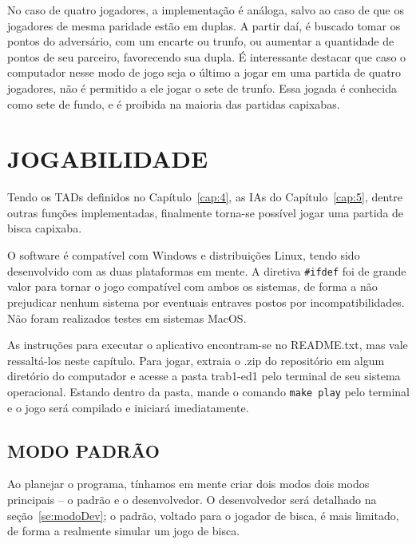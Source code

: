 \documentclass[12pt, oneside, a4paper, brazil]{abntex2}
\begin{document}
No caso de quatro jogadores, a implementação é análoga, salvo ao caso de que os jogadores de mesma paridade estão em duplas. A partir daí, é buscado tomar os pontos do adversário, com um encarte ou trunfo, ou aumentar a quantidade de pontos de seu parceiro, favorecendo sua dupla. É interessante destacar que caso o computador nesse modo de jogo seja o último a jogar em uma partida de quatro jogadores, não é permitido a ele jogar o sete de trunfo. Essa jogada é conhecida como sete de fundo, e é proibida na maioria das partidas capixabas.

\chapter{JOGABILIDADE}\label{cap:6}
Tendo os TADs definidos no Capítulo~\ref{cap:4}, as IAs do Capítulo~\ref{cap:5}, dentre outras funções implementadas, finalmente torna-se possível jogar uma partida de bisca capixaba.

O software é compatível com Windows e distribuições Linux, tendo sido desenvolvido com as duas plataformas em mente. A diretiva \texttt{\#ifdef} foi de grande valor para tornar o jogo compatível com ambos os sistemas, de forma a não prejudicar nenhum sistema por eventuais entraves postos por incompatibilidades. Não foram realizados testes em sistemas MacOS.

As instruções para executar o aplicativo encontram-se no README.txt, mas vale ressaltá-los neste capítulo. Para jogar, extraia o .zip do repositório em algum diretório do computador e acesse a pasta trab1-ed1 pelo terminal de seu sistema operacional. Estando dentro da pasta, mande o comando \texttt{make play} pelo terminal e o jogo será compilado e iniciará imediatamente.\footnotemark


\section{MODO PADRÃO}
Ao planejar o programa, tínhamos em mente criar dois modos dois modos principais -- o padrão e o desenvolvedor. O desenvolvedor será detalhado na seção~\ref{se:modoDev}; o padrão, voltado para o jogador de bisca, é mais limitado, de forma a realmente simular um jogo de bisca.
\end{document}
